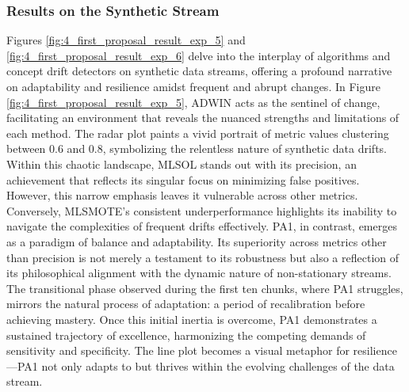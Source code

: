 \subsubsection{Results on the Synthetic Stream}
Figures \ref{fig:4_first_proposal_result_exp_5} and \ref{fig:4_first_proposal_result_exp_6} delve into the interplay of algorithms and concept drift detectors on synthetic data streams, offering a profound narrative on adaptability and resilience amidst frequent and abrupt changes. In Figure \ref{fig:4_first_proposal_result_exp_5}, ADWIN acts as the sentinel of change, facilitating an environment that reveals the nuanced strengths and limitations of each method. The radar plot paints a vivid portrait of metric values clustering between 0.6 and 0.8, symbolizing the relentless nature of synthetic data drifts. Within this chaotic landscape, MLSOL stands out with its precision, an achievement that reflects its singular focus on minimizing false positives. However, this narrow emphasis leaves it vulnerable across other metrics. Conversely, MLSMOTE's consistent underperformance highlights its inability to navigate the complexities of frequent drifts effectively. PA1, in contrast, emerges as a paradigm of balance and adaptability. Its superiority across metrics other than precision is not merely a testament to its robustness but also a reflection of its philosophical alignment with the dynamic nature of non-stationary streams. The transitional phase observed during the first ten chunks, where PA1 struggles, mirrors the natural process of adaptation: a period of recalibration before achieving mastery. Once this initial inertia is overcome, PA1 demonstrates a sustained trajectory of excellence, harmonizing the competing demands of sensitivity and specificity. The line plot becomes a visual metaphor for resilience—PA1 not only adapts to but thrives within the evolving challenges of the data stream.

